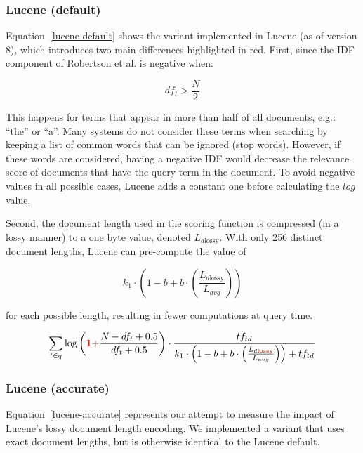 \subsubsection{Lucene (default)}
Equation~\ref{lucene-default} shows the variant implemented in Lucene (as of version 8), which introduces two main differences highlighted in red. First, since the IDF component of Robertson et al. is negative when:

\begin{equation}
	df_t > \frac{N}{2} 
\end{equation}

This happens for terms that appear in more than half of all documents, e.g.: ``the'' or ``a''. Many systems do not consider these terms when searching by keeping a list of common words that can be ignored (stop words). However, if these words are considered, having a negative IDF would decrease the relevance score of documents that have the query term in the document. To avoid negative values in all possible cases, Lucene adds a constant one before calculating the $log$ value. 

Second, the document length used in the scoring function is compressed (in a lossy manner) to a one byte value, denoted $L_{d\text{lossy}}$. With only 256 distinct document lengths, Lucene can pre-compute the value of

\begin{equation}
	k_1 \cdot \left(1-b+b\cdot\left(\frac{L_{d\text{lossy}}}{L_{avg}}\right)\right)
\end{equation}

for each possible length, resulting in fewer computations at query time.

\begin{equation}
	\label{lucene-default}
	\sum_{t\in q}\log\left(\mathbf{\begingroup\color{ruhuisstijlrood}1 +\endgroup} \frac{N-df_t+0.5}{df_t+0.5}\right)\cdot\frac{tf_{td}}{k_1\cdot\left(1-b+b\cdot\left(\frac{L_{d \mathbf{\begingroup\color{ruhuisstijlrood}lossy\endgroup}}}{L_{avg}}\right)\right)+tf_{td}}
\end{equation}

\subsubsection{Lucene (accurate)}

Equation~\ref{lucene-accurate} represents our attempt to measure the impact of Lucene’s lossy document length encoding. We implemented a variant that uses exact document lengths, but is otherwise identical to the Lucene default.

